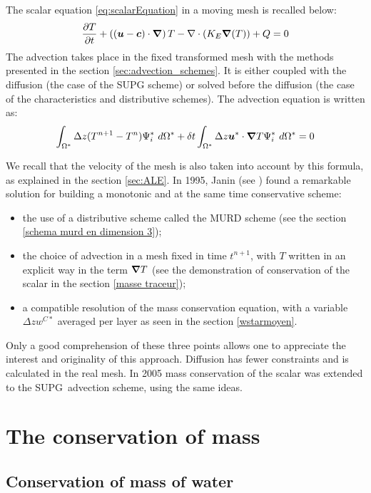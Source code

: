 The scalar equation \eqref{eq:scalarEquation} in a moving mesh is
recalled below:
\begin{equation}
\dfrac{\partial T}{\partial t}+\left((\bm{u}-\bm{c})\cdot\bm{\nabla}\right)
T - \nabla \cdot\left(K_E\bm{\nabla}(T)\right)+Q=0
\end{equation}
The advection takes place in the fixed transformed mesh
with the methods presented in the section \ref{sec:advection_schemes}.
It is either coupled with the diffusion (the case of the SUPG scheme) or
solved before the diffusion (the case of the characteristics
and distributive schemes). The advection equation is written as:%
\begin{equation}
\int_{\Omega^{\ast}}\Delta z(T^{n+1}-T^{n})\Psi_{i}^{\ast}~d\Omega^{\ast}
+\delta t\int_{\Omega^{\ast}}\Delta z\bm{u}^{\ast}\cdot\bm{\nabla} T
\Psi_{i}^{\ast}~d\Omega^{\ast}=0
\end{equation}

We recall that the velocity of the mesh is also taken into
account by this formula, as explained in the section \ref{sec:ALE}.
In 1995, Janin (see \cite{janin95}) found a remarkable solution for building a monotonic and at the same time conservative scheme:
\begin{itemize}
\item the use of a distributive scheme called the MURD scheme
(see the section \ref{schema murd en dimension 3});
\item the choice of advection in a mesh fixed in time $t^{n+1}$,
with $T$ written in an explicit way in the term $\bm{\nabla} T$
(see the demonstration of conservation of the scalar in the
section \ref{masse traceur});
\item a compatible resolution of the mass conservation equation,
with a variable $\Delta zw^{C\ast}$ averaged per layer as seen
in the section \ref{wstarmoyen}.
\end{itemize}

Only a good comprehension of these three points allows one to
appreciate the interest and originality of this approach.
Diffusion has fewer constraints and is calculated in the real mesh.
In 2005 mass conservation of the scalar was extended to the SUPG\ advection scheme, using the same ideas.

\section{\label{masse en 3D}The conservation of mass}

\subsection{\label{masse d'eau}Conservation of mass of water%
%
}

